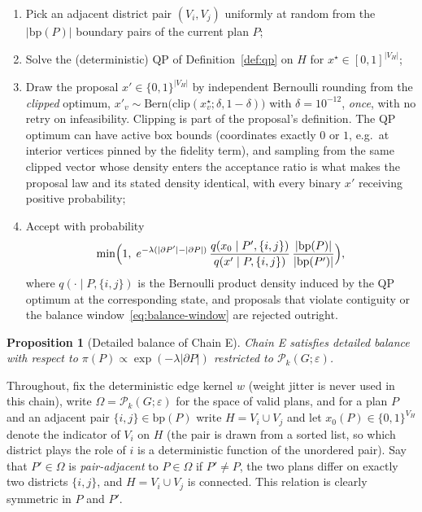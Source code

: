 \documentclass[11pt]{article}
\newtheorem{proposition}{Proposition}[section]
\begin{document}
\begin{enumerate}
  \item Pick an adjacent district pair $(V_i, V_j)$ uniformly at random
    from the $|\mathrm{bp}(P)|$ boundary pairs of the current plan $P$;
  \item Solve the (deterministic) QP of Definition~\ref{def:qp} on
    $H$ for $x^\star \in [0,1]^{|V_H|}$;
  \item Draw the proposal $x' \in \{0,1\}^{|V_H|}$ by independent
    Bernoulli rounding from the \emph{clipped} optimum,
    $x'_v \sim \mathrm{Bern}\bigl(\mathrm{clip}(x^\star_v;
    \delta, 1-\delta)\bigr)$ with $\delta = 10^{-12}$,
    \emph{once}, with no retry on infeasibility. Clipping is part of the
    proposal's definition. The QP optimum can have active box bounds
    (coordinates exactly $0$ or $1$, e.g.\ at interior vertices pinned
    by the fidelity term), and sampling from the same clipped vector
    whose density enters the acceptance ratio is what makes the
    proposal law and its stated density identical, with every binary
    $x'$ receiving positive probability;
  \item Accept with probability
    \begin{equation}\label{eq:qpmh-accept}
      \min\Bigl(1,\;
      e^{-\lambda(|\partial P'| - |\partial P|)}\,
      \frac{q(x_0 \mid P', \{i,j\})}{q(x' \mid P, \{i,j\})}\,
      \frac{|\mathrm{bp}(P)|}{|\mathrm{bp}(P')|}\Bigr),
    \end{equation}
    where $q(\cdot \mid P, \{i,j\})$ is the Bernoulli product density
    induced by the QP optimum at the corresponding state, and proposals
    that violate contiguity or the balance
    window~\eqref{eq:balance-window} are rejected outright.
\end{enumerate}

\begin{proposition}[Detailed balance of Chain E]\label{prop:qpmh-db}
Chain E satisfies detailed balance with respect to
$\pi(P) \propto \exp(-\lambda |\partial P|)$ restricted to
$\mathcal{P}_k(G; \varepsilon)$.
\end{proposition}

Throughout, fix the deterministic edge kernel $w$ (weight jitter is
never used in this chain), write $\Omega = \mathcal{P}_k(G;
\varepsilon)$ for the space of valid plans, and for a plan $P$ and an adjacent
pair $\{i,j\} \in \mathrm{bp}(P)$ write $H = V_i \cup V_j$ and let
$x_0(P) \in \{0,1\}^{V_H}$ denote the indicator of $V_i$ on $H$ (the
pair is drawn from a sorted list, so which district plays the role of
$i$ is a deterministic function of the unordered pair). Say that
$P' \in \Omega$ is \emph{pair-adjacent} to $P \in \Omega$ if
$P' \ne P$, the two plans differ on exactly two districts $\{i,j\}$,
and $H = V_i \cup V_j$ is connected. This relation is clearly
symmetric in $P$ and $P'$.
\end{document}
